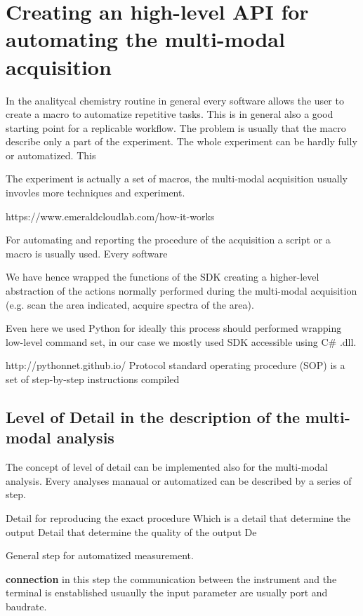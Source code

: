 \chapter{Creating an high-level API for automating the multi-modal acquisition}

In the analitycal chemistry routine in general every software allows the user to create a macro to automatize repetitive tasks. This is  in general also a good starting point for a replicable  workflow. The problem is usually that the macro describe only a part of the experiment. The whole experiment can be hardly fully or automatized. This  

The experiment is actually a set of macros, the multi-modal acquisition usually invovles more techniques and experiment. 


https://www.emeraldcloudlab.com/how-it-works

For automating and reporting the procedure of the acquisition a script or a macro is usually used. Every software 


We have hence wrapped the functions of the SDK creating a higher-level abstraction of the actions normally performed during the multi-modal acquisition (e.g. scan the area indicated, acquire spectra of the area). 

Even here we used Python for ideally this process should performed wrapping low-level command set, in our case we mostly used SDK accessible using C\# .dll.

http://pythonnet.github.io/
Protocol 
 standard operating procedure (SOP) is a set of step-by-step instructions compiled 

\section{Level of Detail in the description of the multi-modal analysis}
The concept of level of detail can be implemented also for the multi-modal analysis. Every analyses manaual or automatized can be described by a series of step.

Detail for reproducing the exact procedure
Which is a detail that determine the output
Detail that determine the quality of the output
De

General step for automatized measurement.

\textbf{connection} in this step the communication between the instrument and the terminal is enstablished usuaully the input parameter are usually port and baudrate.



